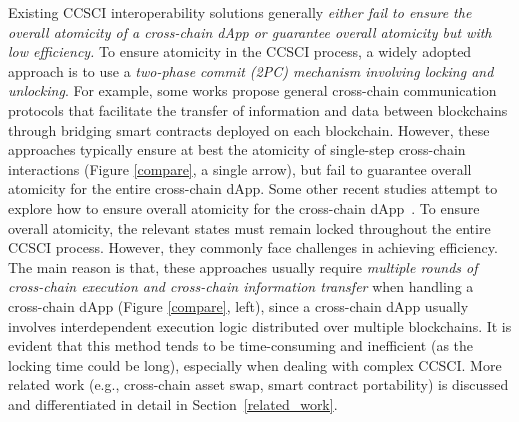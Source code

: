 Existing CCSCI interoperability solutions generally \emph{either fail to ensure the overall atomicity of a cross-chain dApp or guarantee overall atomicity but with low efficiency. }
To ensure atomicity in the CCSCI process, a widely adopted approach is to use a \emph{two-phase commit (2PC) mechanism \cite{lampson1993twopc, Falazi2024crosschain} involving locking and unlocking}.
For example, some works \cite{nissl2021towards,wood2016polkadot,cosmos2019,abebe2019enabling,darshan2023an,reigsbergen2023demo,ghosh2021leveraging,garoffolo2020zendoo} propose general cross-chain communication protocols that facilitate the transfer of information and data between blockchains through bridging smart contracts deployed on each blockchain.
However, these approaches typically ensure at best the atomicity of single-step cross-chain interactions (Figure \ref{compare}, a single arrow), but fail to guarantee overall atomicity for the entire cross-chain dApp.
Some other recent studies attempt to explore how to ensure overall atomicity for the cross-chain dApp~\cite{robinson2021general,atomic-ibc,chen2024atomci,Falazi2024crosschain}. 
To ensure overall atomicity, the relevant states must remain locked throughout the entire CCSCI process.
However, they commonly face challenges in achieving efficiency. 
The main reason is that, these approaches usually require \emph{multiple rounds of cross-chain execution and cross-chain information transfer} when handling a cross-chain dApp (Figure \ref{compare}, left), since a cross-chain dApp usually involves interdependent execution logic distributed over multiple blockchains.
It is evident that this method tends to be time-consuming and inefficient (as the locking time could be long), especially when dealing with complex CCSCI. 
More related work (e.g., cross-chain asset swap, smart contract portability) is discussed and differentiated in detail in Section~\ref{related_work}.

